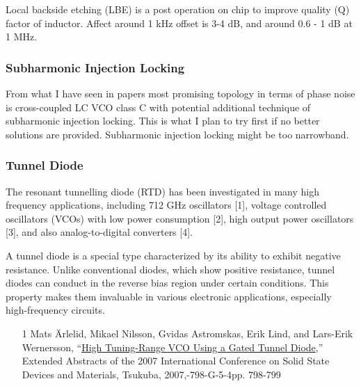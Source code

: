 Local backside etching (LBE) is a post operation on chip to improve quality (Q) factor of inductor. Affect around 1 kHz offset is 3-4 dB, and around 0.6 - 1 dB at 1 MHz.

\subsubsection*{Subharmonic Injection Locking}
From what I have seen in papers most promising topology in terms of phase noise is cross-coupled LC VCO class C with potential additional technique of subharmonic injection locking. This is what I plan to try first if no better solutions are provided. Subharmonic injection locking might be too narrowband. %

\subsubsection*{Tunnel Diode}



\begin{info}
	The resonant tunnelling diode (RTD) has been investigated in many high frequency applications, including 712 GHz oscillators [1], voltage controlled oscillators (VCOs) with low power consumption [2], high output power oscillators [3], and also analog-to-digital converters [4].
\end{info}

A tunnel diode is a special type characterized by its ability to exhibit negative resistance. Unlike conventional diodes, which show positive resistance, tunnel diodes can conduct in the reverse bias region under certain conditions. This property makes them invaluable in various electronic applications, especially high-frequency circuits.

\begin{itemize}
	\item [1] Mats Ärlelid, Mikael Nilsson, Gvidas Astromskas, Erik Lind, and Lars-Erik Wernersson, “\href{https://confit.atlas.jp/guide/event-img/ssdm2007/G-5-4/public/pdf_archive?type=in}{High Tuning-Range VCO Using a Gated Tunnel Diode},” Extended Abstracts of the 2007 International Conference on Solid State Devices and Materials, Tsukuba, 2007,-798-G-5-4pp. 798-799
\end{itemize}

